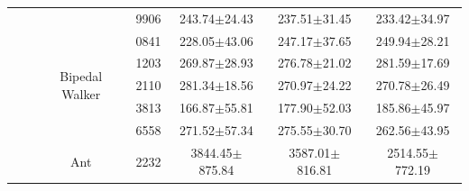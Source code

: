 \begin{table}[t]
\begin{tabular}{ccccccc}
                          &                       &                                 & 9906        & 243.74$\pm$24.43                                                               & 237.51$\pm$31.45                                                           & 233.42$\pm$34.97                                                           \\ 
    \cline{3-7}
                          &                       & \multirow{5}{*}{Bipedal Walker} & 0841        & 228.05$\pm$43.06                                                               & 247.17$\pm$37.65                                                           & 249.94$\pm$28.21                                                           \\
                          &                       &                                 & 1203        & 269.87$\pm$28.93                                                               & 276.78$\pm$21.02                                                           & 281.59$\pm$17.69                                                           \\
                          &                       &                                 & 2110        & 281.34$\pm$18.56                                                               & 270.97$\pm$24.22                                                           & 270.78$\pm$26.49                                                           \\
                          &                       &                                 & 3813        & 166.87$\pm$55.81                                                               & 177.90$\pm$52.03                                                           & 185.86$\pm$45.97                                                           \\
                          &                       &                                 & 6558        & 271.52$\pm$57.34                                                               & 275.55$\pm$30.70                                                           & 262.56$\pm$43.95                                                           \\ 
    \cline{3-7}
                          &                       & \multirow{5}{*}{Ant}            & 2232        & 3844.45$\pm$875.84                                                             & 3587.01$\pm$816.81                                                         & 2514.55$\pm$772.19                                                         \\

\end{tabular}
\end{table}
